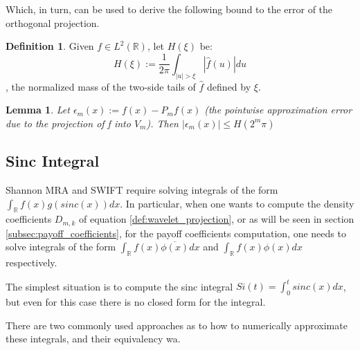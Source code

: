 \documentclass[12,twoside]{mammeTFM}
\newtheorem{lem}[thm]{Lemma}
\theoremstyle{definition}
\newtheorem{definition}[thm]{Definition}
\theoremstyle{remark}
\newcommand{\R}{\ensuremath{\mathbb{R}}}
\begin{document}
Which, in turn, can be used to derive the following bound to the error of the orthogonal projection.

\begin{definition}Given $f \in L^2(\R)$, let $H(\xi)$ be:
\begin{equation}
H(\xi) := \dfrac{1}{2 \pi} \int_{|u| > \xi}\left|\hat{f}(u)\right| du
\end{equation}
, the normalized mass of the two-side tails of $\hat{f}$ defined by $\xi$.
\end{definition}

\begin{lem} \label{lem:projection_error} Let $\epsilon_m(x) := f(x) - P_m f(x)$ (the pointwise approximation error due to the projection of f into $V_m$). Then $|\epsilon_m(x)| \leq H(2^m \pi)$ \cite{mar17}
\end{lem}


\subsection{Sinc Integral}\label{sec:sinc_integral}
Shannon MRA and SWIFT require solving integrals of the form $\int_{\R} f(x) g(sinc(x)) dx$. In particular, when one wants to compute the density coefficients $D_{m,k}$ of equation \ref{def:wavelet_projection}, or as will be seen in section \ref{subsec:payoff_coefficients}, for the payoff coefficients computation, one needs to solve integrals of the form $\int_{\R} f(x) \overline{\phi(x)} dx$ and $\int_{\R} f(x) \phi(x) dx$ respectively.

The simplest situation is to compute the sinc integral $Si(t) = \int_0^t{sinc(x) dx}$, but even for this case there is no closed form for the integral. 

There are two commonly used approaches as to how to numerically approximate these integrals, and their equivalency wa. 
\end{document}
